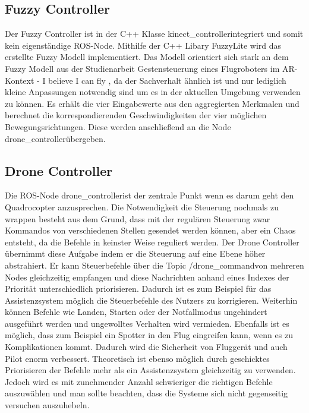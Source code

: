 \subsection{Fuzzy Controller}
Der Fuzzy Controller ist in der C++ Klasse \grqq kinect\_controller\grqq \space integriert und somit kein eigenständige ROS-Node. Mithilfe der C++ Libary FuzzyLite\cite{fuzzylite} wird das erstellte Fuzzy Modell implementiert. Das Modell orientiert sich stark an dem Fuzzy Modell aus der Studienarbeit \grqq Gestensteuerung eines Flugroboters im AR-Kontext - I believe I can fly \grqq\cite{studienarbeitfly}, da der Sachverhalt ähnlich ist und nur lediglich kleine Anpassungen notwendig sind um es in der aktuellen Umgebung verwenden zu können. Es erhält die vier Eingabewerte aus den aggregierten Merkmalen und berechnet die korrespondierenden Geschwindigkeiten der vier möglichen Bewegungsrichtungen. Diese werden anschließend an die Node \grqq drone\_controller\grqq \space übergeben.
\subsection{Drone Controller}
Die ROS-Node \grqq drone\_controller\grqq \space ist der zentrale Punkt wenn es darum geht den Quadrocopter anzusprechen. Die Notwendigkeit die Steuerung nochmals zu wrappen besteht aus dem Grund, dass mit der regulären Steuerung zwar Kommandos von verschiedenen Stellen gesendet werden können, aber ein Chaos entsteht, da die Befehle in keinster Weise reguliert werden. Der Drone Controller übernimmt diese Aufgabe indem er die Steuerung auf eine Ebene höher abstrahiert. Er kann Steuerbefehle über die Topic \grqq /drone\_command\grqq \space von mehreren Nodes gleichzeitig empfangen und diese Nachrichten anhand eines Indexes der Priorität unterschiedlich priorisieren. Dadurch ist es zum Beispiel für das Assistenzsystem möglich die Steuerbefehle des Nutzers zu korrigieren. Weiterhin können Befehle wie Landen, Starten oder der Notfallmodus ungehindert ausgeführt werden und ungewolltes Verhalten wird vermieden. Ebenfalls ist es möglich, dass zum Beispiel ein Spotter in den Flug eingreifen kann, wenn es zu Komplikationen kommt. Dadurch wird die Sicherheit von Fluggerät und auch Pilot enorm verbessert. Theoretisch ist ebenso möglich durch geschicktes Priorisieren der Befehle mehr als ein Assistenzsystem gleichzeitig zu verwenden. Jedoch wird es mit zunehmender Anzahl schwieriger die richtigen Befehle auszuwählen und man sollte beachten, dass die Systeme sich nicht gegenseitig versuchen auszuhebeln. 
